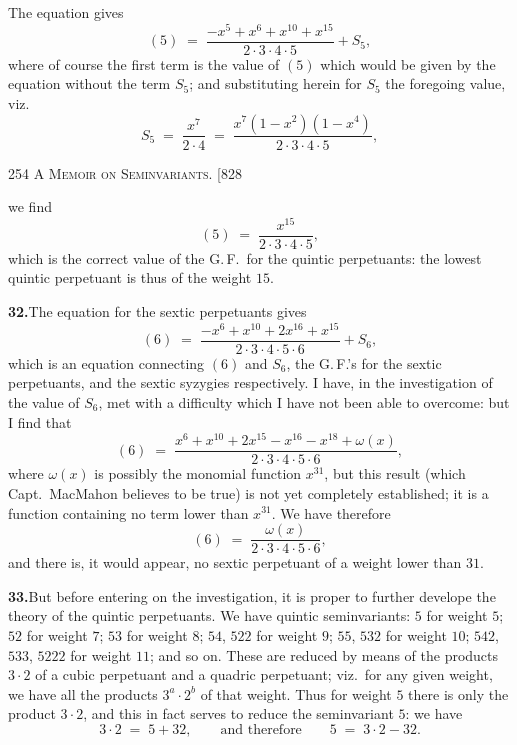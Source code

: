 \documentclass[11pt]{article}
\begin{document}
\medskip
The equation gives
\[
(5) \;=\; \frac{-x^{5}+x^{6}+x^{10}+x^{15}}{2\cdot 3\cdot 4\cdot 5} + S_{5},
\]
where of course the first term is the value of $(5)$ which would be given by the
equation without the term $S_{5}$; and substituting herein for $S_{5}$ the foregoing
value, viz.\
\[
S_{5} \;=\; \frac{x^{7}}{2\cdot 4} \;=\; \frac{x^{7}(1-x^{2})(1-x^{4})}{2\cdot 3\cdot 4\cdot 5},
\]

\newpage
\noindent\textsc{254 \hfill A Memoir on Seminvariants. \hfill [828}
\vspace{0.6em}

\noindent we find
\[
(5) \;=\; \frac{x^{15}}{2\cdot 3\cdot 4\cdot 5},
\]
which is the correct value of the G.\,F.\ for the quintic perpetuants: the lowest
quintic perpetuant is thus of the weight $15$.

\medskip
\noindent\textbf{32.}\quad The equation for the sextic perpetuants gives
\[
(6) \;=\; \frac{-x^{6}+x^{10}+2x^{16}+x^{15}}{2\cdot 3\cdot 4\cdot 5\cdot 6} + S_{6},
\]
which is an equation connecting $(6)$ and $S_{6}$, the G.\,F.'s for the sextic
perpetuants, and the sextic syzygies respectively. I have, in the investigation of
the value of $S_{6}$, met with a difficulty which I have not been able to overcome:
but I find that
\[
(6) \;=\; \frac{x^{6}+x^{10}+2x^{15}-x^{16}-x^{18}+\omega(x)}{2\cdot 3\cdot 4\cdot 5\cdot 6},
\]
where $\omega(x)$ is possibly the monomial function $x^{31}$, but this result (which
Capt.\ MacMahon believes to be true) is not yet completely established; it is a
function containing no term lower than $x^{31}$. We have therefore
\[
(6) \;=\; \frac{\omega(x)}{2\cdot 3\cdot 4\cdot 5\cdot 6},
\]
and there is, it would appear, no sextic perpetuant of a weight lower than $31$.

\medskip
\noindent\textbf{33.}\quad But before entering on the investigation, it is proper to
further develope the theory of the quintic perpetuants. We have quintic seminvariants:
$5$ for weight $5$; $52$ for weight $7$; $53$ for weight $8$; $54$, $522$ for weight
$9$; $55$, $532$ for weight $10$; $542$, $533$, $5222$ for weight $11$; and so on.
These are reduced by means of the products $3\cdot 2$ of a cubic perpetuant and a
quadric perpetuant; viz.\ for any given weight, we have all the products $3^{a}\cdot 2^{b}$
of that weight. Thus for weight $5$ there is only the product $3\cdot 2$, and this in
fact serves to reduce the seminvariant $5$: we have
\[
3\cdot 2 \;=\; 5+32, \qquad\text{and therefore}\qquad 5 \;=\; 3\cdot 2 - 32.
\]
\end{document}
